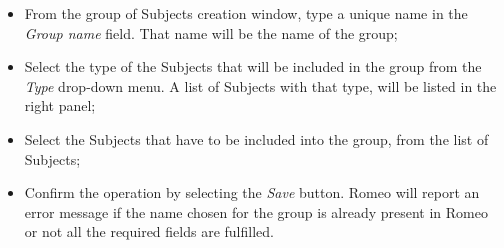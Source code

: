 \begin{itemize}
\item From the group of Subjects\g{} creation window, type a unique name in the \textit{Group name} field. That name will be the name of the group;
\item Select the type of the Subjects\g{} that will be included in the group from the \textit{Type} drop-down menu. A list of Subjects\g{} with that type, will be listed in the right panel;
\item Select the Subjects\g{} that have to be included into the group, from the list of Subjects\g{};
\item Confirm the operation by selecting the \textit{Save} button. Romeo will report an error message if the name chosen for the group is already present in Romeo or not all the required fields are fulfilled.
\end{itemize}

